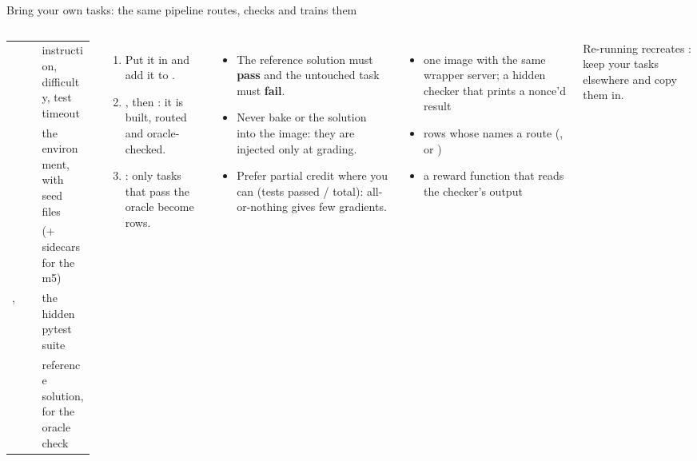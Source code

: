 \begin{frame}{Bring your own tasks: the same pipeline routes, checks and trains them}
\begin{columns}[T]
\scriptsize\setlength{\tabcolsep}{3pt}
\begin{tabularx}{\linewidth}{@{}P{0.36\linewidth}Y@{}}
\toprule
{} & instruction, difficulty, test timeout\\
 & the environment, with seed files\\
 &  (+ sidecars for the m5)\\
,  & the hidden pytest suite\\
 & reference solution, for the oracle check\\
\bottomrule
\end{tabularx}
\par\vspace{2mm}
\begin{enumerate}\scriptsize\setlength{\itemsep}{0.5mm}
\item Put it in  and add it to .
\item {}, then : it is built, routed and oracle-checked.
\item {}: only tasks that pass the oracle become rows.
\end{enumerate}
\begin{itemize}\scriptsize\setlength{\itemsep}{0.7mm}
\item The reference solution must \textbf{pass} and the untouched task must \textbf{fail}.
\item Never bake  or the solution into the image: they are injected only at grading.
\item Prefer partial credit where you can (tests passed / total): all-or-nothing gives few gradients.
\end{itemize}
\begin{itemize}\scriptsize\setlength{\itemsep}{0.7mm}
\item one image with the same wrapper server; a hidden checker that prints a nonce'd result
\item rows whose  names a route (,  or )
\item a reward function that reads the checker's output
\end{itemize}
{\tiny Re-running  recreates : keep your tasks elsewhere and copy them in.}
\end{columns}
\end{frame}

